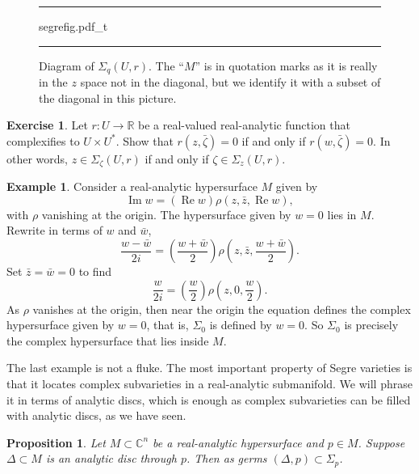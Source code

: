 \documentclass[12pt,openany]{book}
\renewcommand{\Re}{\operatorname{Re}}
\renewcommand{\Im}{\operatorname{Im}}
\newcommand{\C}{{\mathbb{C}}}
\newcommand{\R}{{\mathbb{R}}}
\theoremstyle{plain}
\newtheorem{prop}[thm]{Proposition}
\theoremstyle{remark}
\theoremstyle{definition}
\newenvironment{exbox}{%
    \def\FrameCommand{\vrule width 1pt \relax\hspace{10pt}}%
    \MakeFramed{\advance\hsize-\width\FrameRestore}%
}{%
    \endMakeFramed
}
\newenvironment{myfig}{%
\begin{figure}[h!t]
\noindent\rule{\textwidth}{0.5pt}\vspace{12pt}\par\centering}%
{\par\noindent\rule{\textwidth}{0.5pt}
\end{figure}}
\theoremstyle{exercise}
\newtheorem{exercise}{Exercise}[section]
\theoremstyle{example}
\newtheorem{example}[thm]{Example}
\begin{document}
\begin{myfig}
\medskip
{segrefig.pdf_t}
\caption{Diagram of $\Sigma_q(U,r)$.
The ``$M$'' is in quotation marks as it is really in the $z$ space not in
the diagonal, but we identify it with a subset of the diagonal in this
picture.\label{fig:segrefig}}
\end{myfig}

\begin{exbox}
\begin{exercise}
Let $r \colon U \to \R$ be a real-valued
real-analytic function that complexifies to
$U \times U^*$.  Show that
$r(z,\bar{\zeta}) = 0$
if and only if
$r(w,\bar{\zeta}) = 0$.  In other words,
$z \in \Sigma_{\zeta}(U,r)$ if and only if
$\zeta \in \Sigma_z(U,r)$.
\end{exercise}
\end{exbox}

\begin{example}
Consider a real-analytic hypersurface $M$ given by
\begin{equation*}
\Im w = (\Re w) \rho(z,\bar{z},\Re w) ,
\end{equation*}
with $\rho$ vanishing at the origin.
The hypersurface given by $w=0$ lies in $M$.
Rewrite in terms of $w$ and $\bar{w}$,
\begin{equation*}
\frac{w-\bar{w}}{2i} = \left(\frac{w+\bar{w}}{2}\right)
\rho\left(z,\bar{z},\frac{w+\bar{w}}{2}\right) .
\end{equation*}
Set $\bar{z} = \bar{w} = 0$ to find
\begin{equation*}
\frac{w}{2i} = \left(\frac{w}{2}\right)
\rho\left(z,0,\frac{w}{2}\right) .
\end{equation*}
As $\rho$ vanishes at the origin, then near the origin the equation
defines the complex hypersurface given by $w=0$,
that is, $\Sigma_0$ is defined by $w = 0$.
So $\Sigma_0$ is precisely the complex hypersurface that lies inside $M$.
\end{example}

The last example is not a fluke.
The most important property of Segre varieties is that it locates complex
subvarieties in a real-analytic submanifold.
We will phrase it in terms of analytic discs, which is
enough as complex subvarieties can be filled with analytic discs,
as we have seen.

\begin{prop}
Let $M \subset \C^n$ be a real-analytic hypersurface and $p \in M$.
Suppose $\Delta \subset M$ is an analytic disc
through $p$.  Then as germs $(\Delta,p) \subset \Sigma_p$.
\end{prop}
\end{document}
